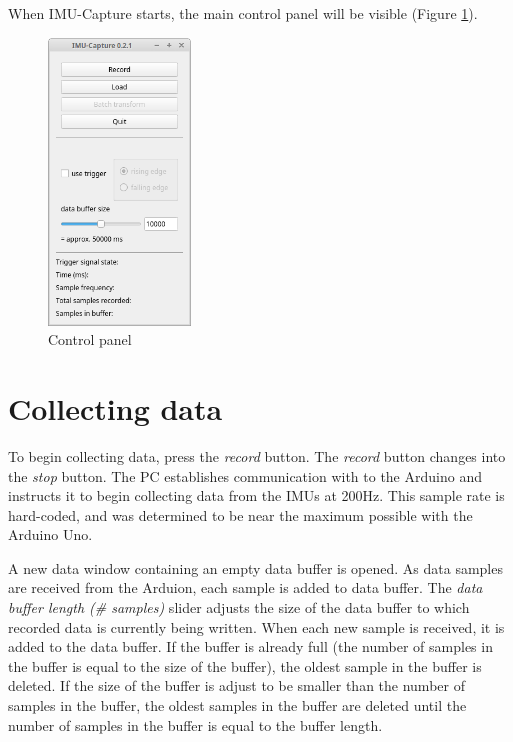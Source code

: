 \documentclass[11pt,letterpaper,article,oneside]{memoir}
\newcommand{\name}{IMU-Capture}
\begin{document}
When \name{} starts, the main control panel will be visible (Figure
\ref{fig:control}).

\begin{figure}[]
    \begin{center}
        \includegraphics[height=3in]{screenshot_panel}
    \end{center}
    \caption{Control panel} 
    \label{fig:control}
\end{figure}




\chapter{Collecting data}

To begin collecting data, press the \emph{record} button.  The \emph{record} button
changes into the \emph{stop} button.  The PC establishes communication with to the
Arduino and instructs it to begin collecting data from the IMUs at 200Hz. This
sample rate is hard-coded, and was determined to be near the maximum possible
with the Arduino Uno.

A new data window containing an empty data buffer is opened. As data samples are received
from the Arduion, each sample is added to data buffer.
The \emph{data buffer length (\# samples)} slider adjusts the size of the data
buffer to which recorded data is currently being written.  When each new sample
is received, it is added to the data buffer. If the buffer is already full (the
number of samples in the buffer is equal to the size of the buffer), the oldest
sample in the buffer is deleted. If the size of the buffer is adjust to be
smaller than the number of samples in the buffer, the oldest samples in the
buffer are deleted until the number of samples in the buffer is equal to the
buffer length.
\end{document}
